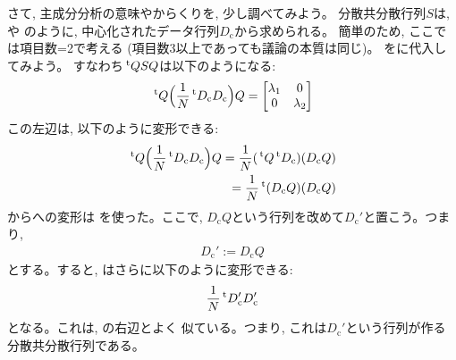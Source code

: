 さて, 主成分分析の意味やからくりを, 少し調べてみよう。
分散共分散行列$S$は, や
のように, 
中心化されたデータ行列$D_{\text{c}}$から求められる。
簡単のため, ここでは項目数=2で考える (項目数3以上であっても議論の本質は同じ)。
をに代入してみよう。
すなわち$\,^{\text t}QSQ$は以下のようになる:
\begin{eqnarray}
\,^{\text t}Q\Bigl(\frac{1}{N}\,^{\text t}D_{\text{c}}D_{\text{c}}\Bigr)Q=
\begin{bmatrix}
\lambda_1 & 0\\
0         & \lambda_2\\
\end{bmatrix}
\label{eq:tQsQ_diag2}\end{eqnarray}
この左辺は, 以下のように変形できる: 
\begin{eqnarray}
\,^{\text t}Q\Bigl(\frac{1}{N}\,^{\text t}D_{\text{c}}D_{\text{c}}\Bigr)Q=
\frac{1}{N}(\,^{\text t}Q\,^{\text t}D_{\text{c}})(D_{\text{c}}Q)\label{eq:tQsQ_diag2_30}\\
=\frac{1}{N}\,^{\text t}(D_{\text{c}}Q)(D_{\text{c}}Q)\label{eq:tQsQ_diag2_4}\end{eqnarray}
からへの変形は
を使った。ここで, $D_{\text{c}}Q$という行列を改めて$D_{\text{c}}'$と置こう。つまり, 
\begin{eqnarray}
D_{\text{c}}':=D_{\text{c}}Q
\end{eqnarray}
とする。すると, はさらに以下のように変形できる: 
\begin{eqnarray}
\frac{1}{N}\,^{\text t}D_{\text{c}}'D_{\text{c}}'
\label{eq:tQsQ_diag6}\end{eqnarray}
となる。これは, の右辺とよく
似ている。つまり, これは$D_{\text{c}}'$という行列が作る分散共分散行列である。

